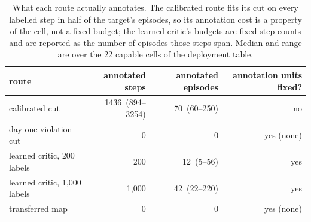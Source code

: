 \begin{table}[t]
\centering
\small
\caption{What each route actually annotates. The calibrated route fits its cut on every labelled step in half of the target's episodes, so its annotation cost is a property of the cell, not a fixed budget; the learned critic's budgets are fixed step counts and are reported as the number of episodes those steps span. Median and range are over the 22 capable cells of the deployment table.}\label{tab:units}
\begin{tabular}{lrrr}
\toprule
route & annotated steps & annotated episodes & annotation units fixed? \\
\midrule
calibrated cut & 1436\ (894--3254) & 70\ (60--250) & no \\
day-one violation cut & 0 & 0 & yes (none) \\
learned critic, 200 labels & 200 & 12\ (5--56) & yes \\
learned critic, 1{,}000 labels & 1{,}000 & 42\ (22--220) & yes \\
transferred map & 0 & 0 & yes (none) \\
\bottomrule
\end{tabular}
\end{table}
